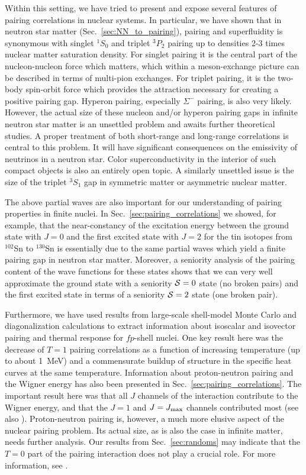 \documentclass[rmp,aps,floatfix]{revtex4}
\begin{document}
Within this setting, we have 
tried to present and expose several features of pairing 
correlations in nuclear systems. 
In particular, we have shown that in neutron star matter 
(Sec.~\ref{sec:NN_to_pairing}), pairing and superfluidity is synonymous with
singlet $^1S_0$ and triplet $^3P_2$ pairing up to densities 2-3 times nuclear
matter saturation density. 
For singlet pairing it is the central part of the nucleon-nucleon 
force which matters, which within a meson-exchange picture  
can be described in terms of multi-pion exchanges. 
For triplet pairing, it is the two-body spin-orbit force which provides
the attraction necessary for creating a positive pairing gap.
Hyperon pairing, especially $\Sigma^-$ pairing, is also
very likely. However, the actual size of these 
nucleon and/or hyperon pairing gaps
in infinite neutron star matter is an unsettled 
problem and awaits further theoretical studies.
A proper treatment of both short-range and long-range correlations 
is central to this problem.
It will have significant consequences on the emissivity of 
neutrinos in a neutron star. Color superconductivity in the interior of such 
compact objects is also an entirely open topic. A similarly unsettled issue 
is the size of 
the triplet $^3S_1$ gap in symmetric matter or asymmetric nuclear matter. 


The above partial waves are also important for our understanding of pairing 
properties in finite nuclei. In Sec.~\ref{sec:pairing_correlations} 
we showed, for example, that the near-constancy 
of the excitation energy between the ground state 
with $J=0$ and the first excited state with $J=2$ 
for the tin isotopes from $^{102}$Sn to $^{130}$Sn is essentially due to the 
same partial waves which yield a finite pairing gap in neutron star matter.
Moreover, a seniority analysis of the pairing content of the wave functions 
for these states shows that we can very well approximate the ground state 
with a seniority ${\cal S} = 0$ state (no broken pairs) and the first 
excited state in terms of a 
seniority   ${\cal S} = 2$ state (one broken pair).

Furthermore, we have used results from large-scale shell-model Monte Carlo 
and diagonalization
calculations to extract information about isoscalar and isovector pairing
and thermal response 
for $fp$-shell nuclei. 
One key result here was the decrease of $T=1$ pairing correlations 
as a function of increasing temperature (up to about 1~MeV) 
and a commensurate buildup of structure in the specific heat 
curves at the same temperature. 
Information about proton-neutron pairing and the Wigner 
energy has also been presented in Sec.~\ref{sec:pairing_correlations}.
The important result here was that all $J$ channels of the 
interaction contribute to the
Wigner energy, and that the $J=1$ and $J=J_{\rm max}$ channels contributed
most (see also \cite{poves98}).
Proton-neutron pairing is, however, a much more elusive  aspect 
of the nuclear pairing problem. 
Its actual size, as is also the case in infinite 
matter, needs further analysis. 
Our results from Sec.~\ref{sec:randoms} may
indicate that the $T=0$ part of the pairing
interaction does not play a crucial role. For more information, see
\cite{volodya1996,volya_2}. 
\end{document}

